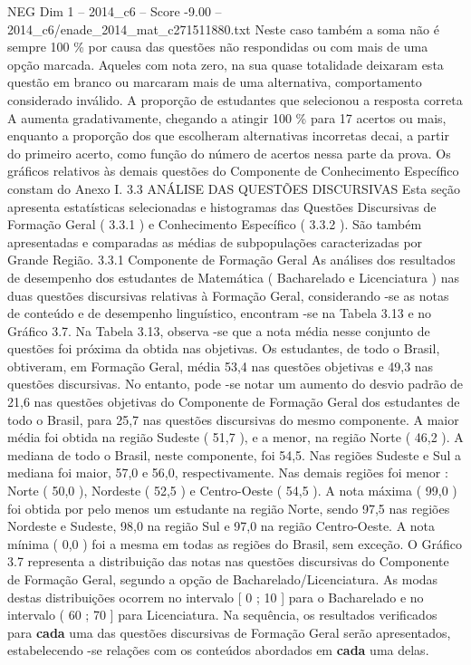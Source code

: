 \begin{textsample}{NEG Dim 1 – 2014\_c6 – Score -9.00 – 2014\_c6/enade\_2014\_mat\_c271511880.txt}
Neste caso também a soma não é sempre 100 \% por causa das questões não respondidas ou com mais de uma opção marcada.
Aqueles com nota zero, na sua quase totalidade deixaram esta questão em branco ou marcaram mais de uma alternativa, comportamento considerado inválido.
A proporção de estudantes que selecionou a resposta correta A aumenta gradativamente, chegando a atingir 100 \% para 17 acertos ou mais, enquanto a proporção dos que escolheram alternativas incorretas decai, a partir do primeiro acerto, como função do número de acertos nessa parte da prova.
Os gráficos relativos às demais questões do Componente de Conhecimento Específico constam do Anexo I. 3.3 ANÁLISE DAS QUESTÕES DISCURSIVAS Esta seção apresenta estatísticas selecionadas e histogramas das Questões Discursivas de Formação Geral ( 3.3.1 ) e Conhecimento Específico ( 3.3.2 ).
São também apresentadas e comparadas as médias de subpopulações caracterizadas por Grande Região. 3.3.1 Componente de Formação Geral As análises dos resultados de desempenho dos estudantes de Matemática ( Bacharelado e Licenciatura ) nas duas questões discursivas relativas à Formação Geral, considerando -se as notas de conteúdo e de desempenho linguístico, encontram -se na Tabela 3.13 e no Gráfico 3.7.
Na Tabela 3.13, observa -se que a nota média nesse conjunto de questões foi próxima da obtida nas objetivas.
Os estudantes, de todo o Brasil, obtiveram, em Formação Geral, média 53,4 nas questões objetivas e 49,3 nas questões discursivas.
No entanto, pode -se notar um aumento do desvio padrão de 21,6 nas questões objetivas do Componente de Formação Geral dos estudantes de todo o Brasil, para 25,7 nas questões discursivas do mesmo componente.
A maior média foi obtida na região Sudeste ( 51,7 ), e a menor, na região Norte ( 46,2 ).
A mediana de todo o Brasil, neste componente, foi 54,5.
Nas regiões Sudeste e Sul a mediana foi maior, 57,0 e 56,0, respectivamente.
Nas demais regiões foi menor : Norte ( 50,0 ), Nordeste ( 52,5 ) e Centro-Oeste ( 54,5 ).
A nota máxima ( 99,0 ) foi obtida por pelo menos um estudante na região Norte, sendo 97,5 nas regiões Nordeste e Sudeste, 98,0 na região Sul e 97,0 na região Centro-Oeste.
A nota mínima ( 0,0 ) foi a mesma em todas as regiões do Brasil, sem exceção.
O Gráfico 3.7 representa a distribuição das notas nas questões discursivas do Componente de Formação Geral, segundo a opção de Bacharelado/Licenciatura.
As modas destas distribuições ocorrem no intervalo [ 0 ; 10 ] para o Bacharelado e no intervalo ( 60 ; 70 ] para Licenciatura.
Na sequência, os resultados verificados para \textbf{cada} uma das questões discursivas de Formação Geral serão apresentados, estabelecendo -se relações com os conteúdos abordados em \textbf{cada} uma delas.

\end{textsample}
